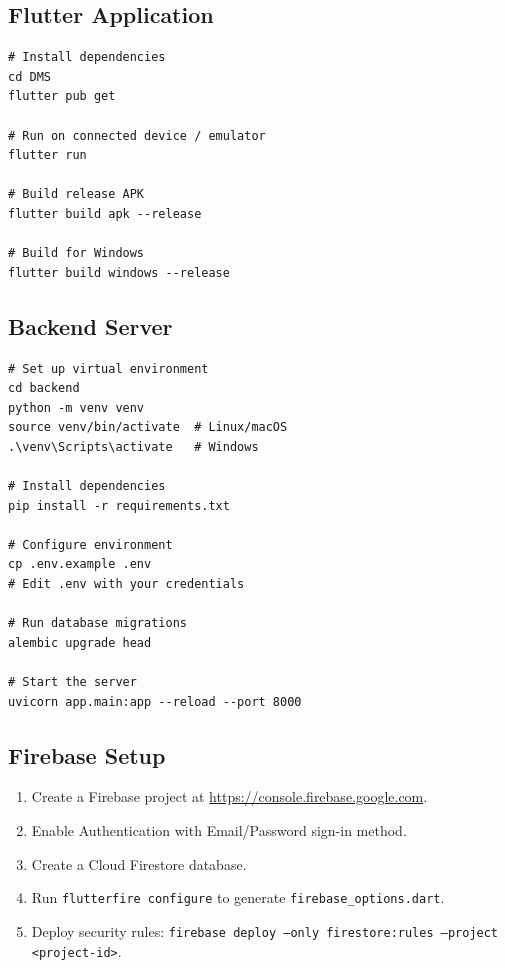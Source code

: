 \documentclass[12pt,a4paper]{article}
\begin{document}
\subsection{Flutter Application}

\begin{lstlisting}[style=yamlstyle]
# Install dependencies
cd DMS
flutter pub get

# Run on connected device / emulator
flutter run

# Build release APK
flutter build apk --release

# Build for Windows
flutter build windows --release
\end{lstlisting}

\subsection{Backend Server}

\begin{lstlisting}[style=yamlstyle]
# Set up virtual environment
cd backend
python -m venv venv
source venv/bin/activate  # Linux/macOS
.\venv\Scripts\activate   # Windows

# Install dependencies
pip install -r requirements.txt

# Configure environment
cp .env.example .env
# Edit .env with your credentials

# Run database migrations
alembic upgrade head

# Start the server
uvicorn app.main:app --reload --port 8000
\end{lstlisting}

\subsection{Firebase Setup}

\begin{enumerate}
    \item Create a Firebase project at \url{https://console.firebase.google.com}.
    \item Enable Authentication with Email/Password sign-in method.
    \item Create a Cloud Firestore database.
    \item Run \texttt{flutterfire configure} to generate \texttt{firebase\_options.dart}.
    \item Deploy security rules: \texttt{firebase deploy --only firestore:rules --project <project-id>}.
\end{enumerate}
\end{document}
